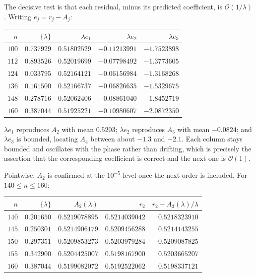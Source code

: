 \documentclass[11pt,oneside]{article}
\theoremstyle{definition}
\theoremstyle{remark}
\newcommand{\bigO}{\mathcal O}
\begin{document}
The decisive test is that each residual, minus its predicted coefficient, is
$\bigO(1/\lambda)$.  Writing $e_j=r_j-A_j$:

\begin{center}\small
\begin{tabular}{@{}rrrrr@{}}
\toprule
$n$ & $\{\lambda\}$ & $\lambda e_1$ & $\lambda e_2$ & $\lambda e_3$\\
\midrule
$100$ & $0.737929$ & $0.51802529$ & $-0.11213991$ & $-1.7523898$\\
$112$ & $0.893526$ & $0.52019699$ & $-0.07798492$ & $-1.3773605$\\
$124$ & $0.033795$ & $0.52164121$ & $-0.06156984$ & $-1.3168268$\\
$136$ & $0.161500$ & $0.52166737$ & $-0.06826635$ & $-1.5329675$\\
$148$ & $0.278716$ & $0.52062406$ & $-0.08861040$ & $-1.8452719$\\
$160$ & $0.387044$ & $0.51925221$ & $-0.10980607$ & $-2.0872350$\\
\bottomrule
\end{tabular}
\end{center}

$\lambda e_1$ reproduces $A_2$ with mean $0.5203$; $\lambda e_2$ reproduces
$A_3$ with mean $-0.0824$; and $\lambda e_3$ is bounded, locating $A_4$ between
about $-1.3$ and $-2.1$.  Each column stays bounded and oscillates with the
phase rather than drifting, which is precisely the assertion that the
corresponding coefficient is correct and the next one is $\bigO(1)$.

Pointwise, $A_2$ is confirmed at the $10^{-5}$ level once the next order is
included.  For $140\le n\le160$:

\begin{center}\small
\begin{tabular}{@{}rrrrr@{}}
\toprule
$n$ & $\{\lambda\}$ & $A_2(\lambda)$ & $r_2$ & $r_2-A_3(\lambda)/\lambda$\\
\midrule
$140$ & $0.201650$ & $0.5219078895$ & $0.5214039042$ & $0.5218323910$\\
$145$ & $0.250301$ & $0.5214906179$ & $0.5209456288$ & $0.5214143255$\\
$150$ & $0.297351$ & $0.5209853273$ & $0.5203979284$ & $0.5209087825$\\
$155$ & $0.342900$ & $0.5204425007$ & $0.5198167900$ & $0.5203665207$\\
$160$ & $0.387044$ & $0.5199082072$ & $0.5192522062$ & $0.5198337121$\\
\bottomrule
\end{tabular}
\end{center}
\end{document}
